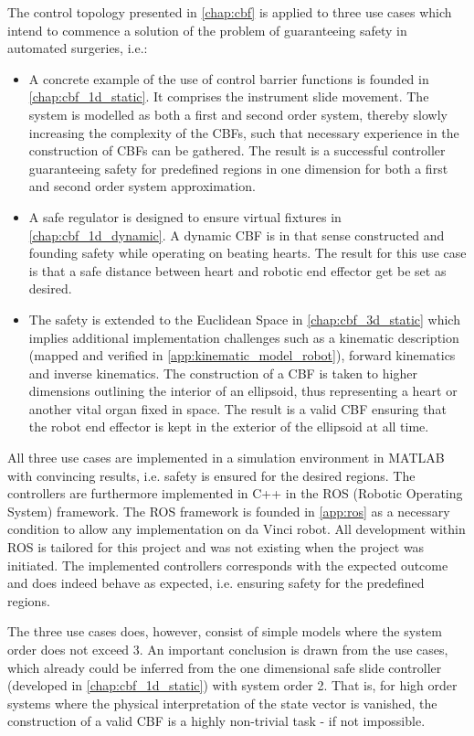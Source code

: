 The control topology presented in \autoref{chap:cbf} is applied to three use cases which intend to commence a solution of the problem of guaranteeing safety in automated surgeries, i.e.:
\begin{itemize}
\item A concrete example of the use of control barrier functions is founded in \autoref{chap:cbf_1d_static}. It comprises the instrument slide movement. The system is modelled as both a first and second order system, thereby slowly increasing the complexity of the CBFs, such that necessary experience in the construction of CBFs can be gathered. The result is a successful controller guaranteeing safety for predefined regions in one dimension for both a first and second order system approximation.
\item A safe regulator is designed to ensure virtual fixtures in \autoref{chap:cbf_1d_dynamic}. A dynamic CBF is in that sense constructed and founding safety while operating on beating hearts. The result for this use case is that a safe distance between heart and robotic end effector get be set as desired.
\item The safety is extended to the Euclidean Space in \autoref{chap:cbf_3d_static} which implies additional implementation challenges such as a kinematic description (mapped and verified in \autoref{app:kinematic_model_robot}), forward kinematics and inverse kinematics. The construction of a CBF is taken to higher dimensions outlining the interior of an ellipsoid, thus representing a heart or another vital organ fixed in space. The result is a valid CBF ensuring that the robot end effector is kept in the exterior of the ellipsoid at all time.
\end{itemize}
All three use cases are implemented in a simulation environment in MATLAB with convincing results, i.e. safety is ensured for the desired regions. The controllers are furthermore implemented in C++ in the ROS (Robotic Operating System) framework. The ROS framework is founded in \autoref{app:ros} as a necessary condition to allow any implementation on da Vinci robot. All development within ROS is tailored for this project and was not existing when the project was initiated. The implemented controllers corresponds with the expected outcome and does indeed behave as expected, i.e. ensuring safety for the predefined regions.

The three use cases does, however, consist of simple models where the system order does not exceed 3. An important conclusion is drawn from the use cases, which already could be inferred from the one dimensional safe slide controller (developed in \autoref{chap:cbf_1d_static}) with system order 2. That is, for high order systems where the physical interpretation of the state vector is vanished, the construction of a valid CBF is a highly non-trivial task - if not impossible. 

